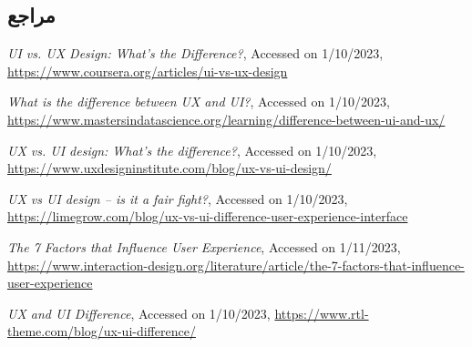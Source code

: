 {\begin{enumerate}[a)]
\end{enumerate}


\subsection*{مراجع}

\begin{latin}
	\begingroup
	\renewcommand{\section}[2]{}%
	
\begin{thebibliography}{9}
	\textit{UI vs. UX Design: What’s the Difference?},
	Accessed on 1/10/2023,
	\url{https://www.coursera.org/articles/ui-vs-ux-design}
	
	\textit{What is the difference between UX and UI?},
	Accessed on 1/10/2023,
	\url{https://www.mastersindatascience.org/learning/difference-between-ui-and-ux/}
	
	\textit{UX vs. UI design: What’s the difference?},
	Accessed on 1/10/2023,
	\url{https://www.uxdesigninstitute.com/blog/ux-vs-ui-design/}
	
	\textit{UX vs UI design – is it a fair fight?},
	Accessed on 1/10/2023,
	\url{https://limegrow.com/blog/ux-vs-ui-difference-user-experience-interface}
	
	\textit{The 7 Factors that Influence User Experience},
	Accessed on 1/11/2023,
	\url{https://www.interaction-design.org/literature/article/the-7-factors-that-influence-user-experience}
	
	\textit{UX and UI Difference},
	Accessed on 1/10/2023,
	\url{https://www.rtl-theme.com/blog/ux-ui-difference/}
\end{thebibliography}
\endgroup
\end{latin}

}
